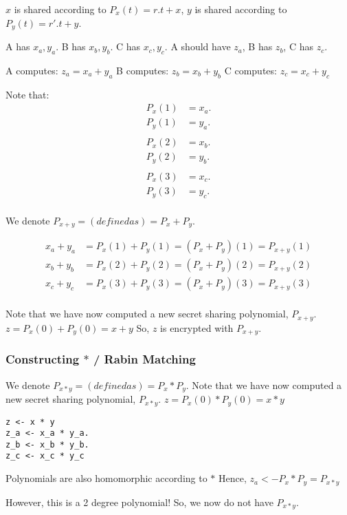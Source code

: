 $x$ is shared according to $P_x(t) = r.t + x$,
$y$ is shared according to $P_y(t) = r'.t + y$.

A has $x_a, y_a$. B has $x_b, y_b$. C has $x_c, y_c$.
A should have $z_a$, B has $z_b$, C has $z_c$.

A computes: $z_a = x_a + y_a$
B computes: $z_b = x_b + y_b$
C computes: $z_c = x_c + y_c$

Note that:
\begin{align*}
P_x(1) &= x_a.\\
P_y(1) &= y_a.\\
\\
P_x(2) &= x_b.\\
P_y(2) &= y_b.\\
\\
P_x(3) &= x_c.\\
P_y(3) &= y_c.\\
\end{align*}


We denote $P_{x + y} =(defined as)= P_x + P_y $.

\begin{align*}
x_a + y_a &= P_x(1) + P_y(1) = (P_x + P_y)(1) = P_{x + y}(1) \\
x_b + y_b &= P_x(2) + P_y(2) = (P_x + P_y)(2) = P_{x + y}(2) \\
x_c + y_c &= P_x(3) + P_y(3) = (P_x + P_y)(3) = P_{x + y}(3) \\
\end{align*}

Note that we have now computed a new secret sharing polynomial,
$P_{x + y}$. $z = P_x(0) + P_y(0) = x + y$ So, $z$ is encrypted with $P_{x + y}$.

\subsubsection{Constructing $*$ / Rabin Matching}
We denote $P_{x * y} =(defined as)= P_x * P_y $.
Note that we have now computed a new secret sharing polynomial,
$P_{x * y}$. $z = P_x(0) * P_y(0) = x * y$


\begin{verbatim}
z <- x * y
z_a <- x_a * y_a.
z_b <- x_b * y_b.
z_c <- x_c * y_c
\end{verbatim}

Polynomials are also homomorphic according to $*$
Hence, $z_a <- P_x * P_y = P_{x * y}$


However, this is a 2 degree polynomial! So, we now do not have $P_{x * y}$.

